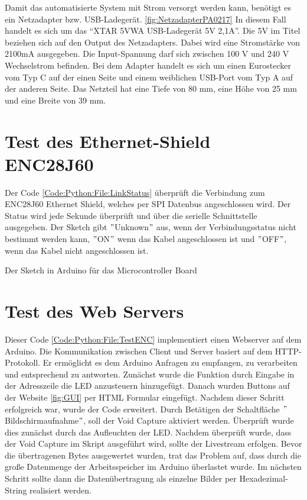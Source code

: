 Damit das automatisierte System mit Strom versorgt werden kann, benötigt es ein Netzadapter bzw. USB-Ladegerät. \ref{fig:NetzadapterPA0217} In diesem Fall handelt es sich um das “XTAR 5VWA USB-Ladegerät 5V 2,1A”. Die 5V im Titel beziehen sich auf den Output des Netzadapters. Dabei wird eine Stromstärke von 2100mA ausgegeben. Die Input-Spannung darf sich zwischen 100 V und 240 V Wechselstrom befinden. Bei dem Adapter handelt es sich um einen Eurostecker vom Typ C auf der einen Seite und einem weiblichen USB-Port vom Typ A auf der anderen Seite. Das Netzteil hat eine Tiefe von 80 mm, eine Höhe von 25 mm und eine Breite von 39 mm. \cite{LogiLink:2019}

\section{Test des  Ethernet-Shield ENC28J60} 

Der Code  \ref{Code:Python:File:LinkStatus}  überprüft die Verbindung zum ENC28J60 Ethernet Shield, welches per SPI Datenbus angeschlossen wird. Der Status wird jede Sekunde überprüft und über die serielle Schnittstelle ausgegeben. Der Sketch gibt $"$Unknown$"$ aus, wenn der Verbindungsstatus nicht bestimmt werden kann, $"$ON$"$ wenn das Kabel angeschlossen ist und $"$OFF$"$, wenn das Kabel nicht angeschlossen ist.

\begin{code}
    
    \caption[Sketch ]{Der Sketch  in Arduino für das Microcontroller Board}
    \label{Code:Python:File:LinkStatus}   
\end{code}

\section{Test des Web Servers} 

Dieser Code \ref{Code:Python:File:TestENC} implementiert einen Webserver auf dem Arduino. Die Kommunikation zwischen Client und Server basiert auf dem HTTP-Protokoll. Er ermöglicht es dem Arduino Anfragen zu empfangen, zu verarbeiten und entsprechend zu antworten.
Zunächst wurde die Funktion durch Eingabe in der Adresszeile die LED anzusteuern hinzugefügt. Danach wurden Buttons auf der Website \ref{fig:GUI} per HTML Formular eingefügt. Nachdem dieser Schritt erfolgreich war, wurde der Code erweitert. Durch Betätigen der Schaltfläche $"$Bildschirmaufnahme$"$, soll der Void Capture aktiviert werden. Überprüft wurde dies zunächst durch das Aufleuchten der LED. Nachdem überprüft wurde, dass der Void Capture im Skript ausgeführt wird, sollte der Livestream erfolgen. Bevor die übertragenen Bytes ausgewertet wurden, trat das Problem auf, dass durch die große Datenmenge der Arbeitsspeicher im Arduino überlastet wurde. Im nächsten Schritt sollte dann die Datenübertragung als einzelne Bilder per Hexadezimal-String realisiert werden.

